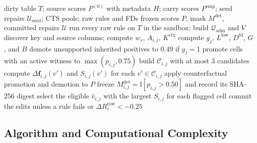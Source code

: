 \documentclass[conference]{IEEEtran}
\begin{document}
\begin{algorithm}[t]
\caption{Closed-Loop Counterfactual Cleaning}
\label{alg:loop}
\footnotesize
\begin{algorithmic}[1]
\Require dirty table $T$; source scores $P^{(0)}$ with metadata $H$; carry scores $P^{\mathrm{emp}}$; seed repairs $\mathcal{U}_{\mathrm{seed}}$; CTS pools; raw rules and FDs
\Ensure frozen scores $P$, mask $M^{\mathrm{det}}$, committed repairs $\mathcal{U}$
\State run every raw rule on $T$ in the sandbox; build $\mathcal{Q}_{\mathrm{adm}}$ and $V$ 
\State discover key and source columns; compute $w_s$, $A_{i,j}$, $K^{\mathrm{ctx}}$ 
\State compute $g_j$, $L^{\mathrm{low}}$, $D^{\mathrm{fd}}$, $G$, and $B$ 
\State demote unsupported inherited positives to 0.49 if $g_j = 1$
\State promote cells with an active witness to $\max(p_{i,j}, 0.75)$
\EndFor
{} 
\State build $\mathcal{C}_{i,j}$ with at most 3 candidates
\State compute $\Delta\mathbf{f}_{i,j}(v')$ and $S_{i,j}(v')$ for each $v' \in \mathcal{C}_{i,j}$ 
\EndFor
\State apply counterfactual promotion and demotion to $P$
\State freeze $M_{i,j}^{\mathrm{det}} = \mathbb{I}[p_{i,j} > 0.50]$ and record its SHA-256 digest
\State select the eligible $\hat{v}_{i,j}$ with the largest $S_{i,j}$ for each flagged cell
\State commit the edits unless a rule fails or $\Delta R_i^{\mathrm{row}} < -0.25$ 
\EndFor
\end{algorithmic}
\end{algorithm}

\subsection{Algorithm and Computational Complexity}
\label{subsec:rep_complexity}
\end{document}
